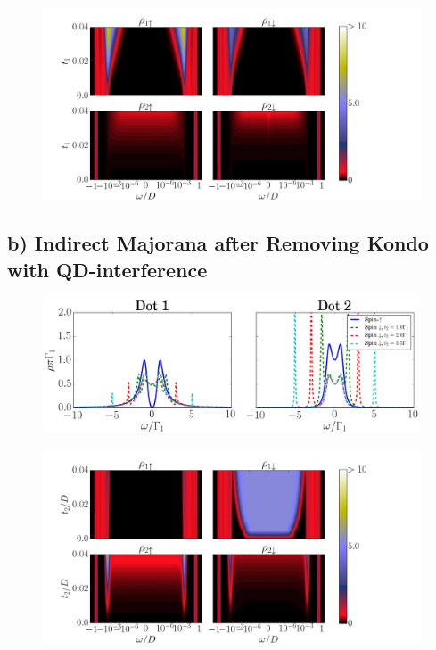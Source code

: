  \begin{figure}[H]
     \centering
     \includegraphics[scale=0.35]{IMAGES/DQD-M/a)-NRG.png}
     \caption{\label{fig:a)NRG} \protect{} }
\end{figure}


\subsection{ b) Indirect Majorana after Removing Kondo with QD-interference \label{sec:b)}}
\begin{figure}[H]
\centering
\includegraphics[scale=0.35]{IMAGES/DQD-M/b).png}
\caption{\label{fig:b)}\protect{} }
\end{figure}

\begin{figure}[H]
    \centering
    \includegraphics[scale=0.35]{IMAGES/DQD-M/b)-NRG.png}
    \caption{\label{fig:b)NRG} \protect{}}
\end{figure}





